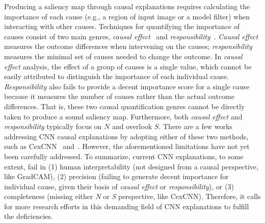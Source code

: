 Producing a saliency map through causal explanations requires calculating the importance of each cause (e.g., a region of input image or a model filter) when interacting with other causes.
Techniques for quantifying the importance of causes consist of two main genres, \textit{causal effect}~\cite{glymour2016causal} and \textit{responsibility}~\cite{chockler2004responsibility}.
\textit{Causal effect} measures the outcome differences when intervening on the causes; \textit{responsibility} measures the minimal set of causes needed to change the outcome.
In \textit{causal effect} analysis, the effect of a group of causes is a single value, which cannot be easily attributed to distinguish the importance of each individual cause.
\textit{Responsibility} also fails to provide a decent importance score for a single cause because it measures the number of causes rather than the actual outcome differences.
That is, these two causal quantification genres cannot be directly taken to produce a sound saliency map.
Furthermore, both \textit{causal effect} and \textit{responsibility} typically focus on $N$ and overlook $S$.
There are a few works addressing CNN causal explanations by adopting either of these two methods, such as CexCNN~\cite{debbi2021causal} and~\cite{harradon2018causal}.
However, the aforementioned limitations have not yet been carefully addressed.
To summarize, current CNN explanations, to some extent, fail in (1) human interpretability (not designed from a causal perspective, like GradCAM), (2) precision (failing to generate decent importance for individual cause, given their basis of \textit{causal effect} or \textit{responsibility}), or (3) completeness (missing either \textit{N} or \textit{S} perspective, like CexCNN).
Therefore, it calls for more research efforts in this demanding field of CNN explanations to fulfill the deficiencies.

